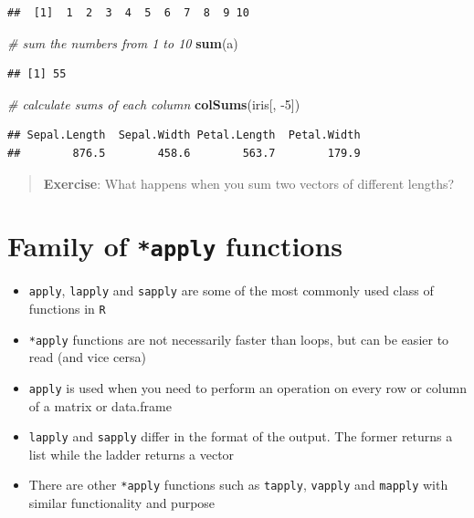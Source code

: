 \documentclass[]{book}
\makeatletter
\newenvironment{Shaded}{\begin{snugshade}}{\end{snugshade}}
\newcommand{\KeywordTok}[1]{\textcolor[rgb]{0.13,0.29,0.53}{\textbf{#1}}}
\newcommand{\DecValTok}[1]{\textcolor[rgb]{0.00,0.00,0.81}{#1}}
\newcommand{\CommentTok}[1]{\textcolor[rgb]{0.56,0.35,0.01}{\textit{#1}}}
\newcommand{\NormalTok}[1]{#1}
\providecommand{\tightlist}{%
  \setlength{\itemsep}{0pt}\setlength{\parskip}{0pt}}
\providecommand{\tightlist}{%
  \setlength{\itemsep}{0pt}\setlength{\parskip}{0pt}}
\newenvironment{kframe}{%
\medskip{}
\setlength{\fboxsep}{.8em}
 \def\at@end@of@kframe{}%
 \ifinner\ifhmode%
  \def\at@end@of@kframe{\end{minipage}}%
  \begin{minipage}{\columnwidth}%
 \fi\fi%
 \def\FrameCommand##1{\hskip\@totalleftmargin \hskip-\fboxsep
 \colorbox{shadecolor}{##1}\hskip-\fboxsep
     \hskip-\linewidth \hskip-\@totalleftmargin \hskip\columnwidth}%
 \MakeFramed {\advance\hsize-\width
   \@totalleftmargin\z@ \linewidth\hsize
   \@setminipage}}%
 {\par\unskip\endMakeFramed%
 \at@end@of@kframe}
\renewenvironment{Shaded}{\begin{kframe}}{\end{kframe}}
\theoremstyle{definition}
\theoremstyle{definition}
\theoremstyle{definition}
\theoremstyle{remark}
\makeatother
\begin{document}
\begin{verbatim}
##  [1]  1  2  3  4  5  6  7  8  9 10
\end{verbatim}

\begin{Shaded}
\begin{Highlighting}[]
\CommentTok{# sum the numbers from 1 to 10}
\KeywordTok{sum}\NormalTok{(a)}
\end{Highlighting}
\end{Shaded}

\begin{verbatim}
## [1] 55
\end{verbatim}

\begin{Shaded}
\begin{Highlighting}[]
\CommentTok{# calculate sums of each column}
\KeywordTok{colSums}\NormalTok{(iris[, }\DecValTok{-5}\NormalTok{])}
\end{Highlighting}
\end{Shaded}

\begin{verbatim}
## Sepal.Length  Sepal.Width Petal.Length  Petal.Width 
##        876.5        458.6        563.7        179.9
\end{verbatim}

\begin{quote}
\textbf{Exercise}: What happens when you sum two vectors of different
lengths?
\end{quote}

\section{\texorpdfstring{Family of \texttt{*apply}
functions}{Family of *apply functions}}\label{family-of-apply-functions}

\begin{itemize}
\tightlist
\item
  \texttt{apply}, \texttt{lapply} and \texttt{sapply} are some of the
  most commonly used class of functions in \texttt{R}
\item
  \texttt{*apply} functions are not necessarily faster than loops, but
  can be easier to read (and vice cersa)
\item
  \texttt{apply} is used when you need to perform an operation on every
  row or column of a matrix or data.frame
\item
  \texttt{lapply} and \texttt{sapply} differ in the format of the
  output. The former returns a list while the ladder returns a vector
\item
  There are other \texttt{*apply} functions such as \texttt{tapply},
  \texttt{vapply} and \texttt{mapply} with similar functionality and
  purpose
\end{itemize}
\end{document}
